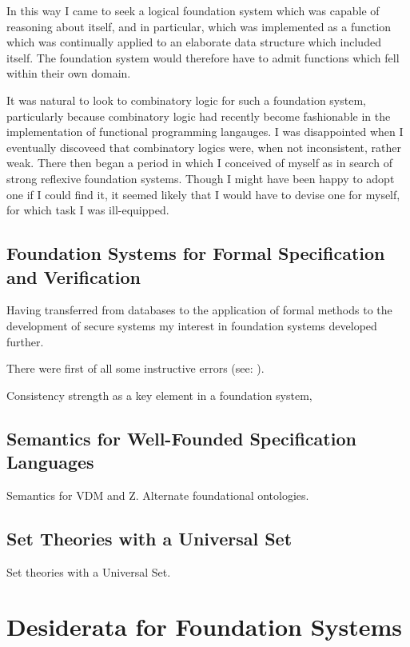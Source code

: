 \documentclass[numreferences]{rbjk}
\begin{document}
\begin{article}
In this way I came to seek a logical foundation system which was capable of reasoning about itself, and in particular, which was implemented as a function which was continually applied to an elaborate data structure which included itself.
The foundation system would therefore have to admit functions which fell within their own domain.

It was natural to look to combinatory logic for such a foundation system, particularly because combinatory logic had recently become fashionable in the implementation of functional programming langauges.
I was disappointed when I eventually discoveed that combinatory logics were, when not inconsistent, rather weak.
There then began a period in which I conceived of myself as in search of strong reflexive foundation systems.
Though I might have been happy to adopt one if I could find it, it seemed likely that I would have to devise one for myself, for which task I was ill-equipped. 

\subsection{Foundation Systems for Formal Specification and Verification}

Having transferred from databases to the application of formal methods to the development of secure systems my interest in foundation systems developed further.

There were first of all some instructive errors (see: \cite{jones86a,jones86b}).

Consistency strength as a key element in a foundation system,

\subsection{Semantics for Well-Founded Specification Languages}

Semantics for VDM and Z.
Alternate foundational ontologies.

\subsection{Set Theories with a Universal Set}
Set theories with a Universal Set.

\section{Desiderata for Foundation Systems}


\end{article}
\end{document}

